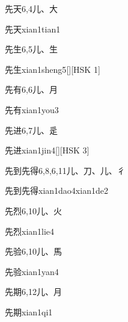 \begin{entry}{先天}{6,4}{⼉、⼤}
  \begin{phonetics}{先天}{xian1tian1}
  \end{phonetics}
\end{entry}

\begin{entry}{先生}{6,5}{⼉、⽣}
  \begin{phonetics}{先生}{xian1sheng5}[][HSK 1]
  \end{phonetics}
\end{entry}

\begin{entry}{先有}{6,6}{⼉、⽉}
  \begin{phonetics}{先有}{xian1you3}
  \end{phonetics}
\end{entry}

\begin{entry}{先进}{6,7}{⼉、⾡}
  \begin{phonetics}{先进}{xian1jin4}[][HSK 3]
  \end{phonetics}
\end{entry}

\begin{entry}{先到先得}{6,8,6,11}{⼉、⼑、⼉、⼻}
  \begin{phonetics}{先到先得}{xian1dao4xian1de2}
  \end{phonetics}
\end{entry}

\begin{entry}{先烈}{6,10}{⼉、⽕}
  \begin{phonetics}{先烈}{xian1lie4}
  \end{phonetics}
\end{entry}

\begin{entry}{先验}{6,10}{⼉、⾺}
  \begin{phonetics}{先验}{xian1yan4}
  \end{phonetics}
\end{entry}

\begin{entry}{先期}{6,12}{⼉、⽉}
  \begin{phonetics}{先期}{xian1qi1}
  \end{phonetics}
\end{entry}

